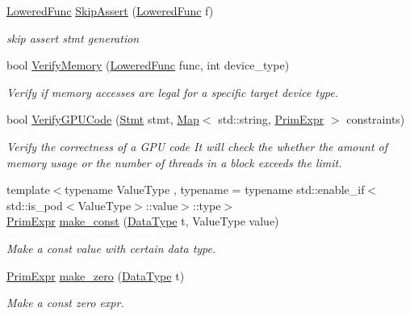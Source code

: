 \begin{DoxyCompactItemize}
\hyperlink{classtvm_1_1tir_1_1LoweredFunc}{Lowered\+Func} \hyperlink{namespacetvm_1_1tir_a9968b6563c42117a9a1cd4576054400f}{Skip\+Assert} (\hyperlink{classtvm_1_1tir_1_1LoweredFunc}{Lowered\+Func} f)
\begin{DoxyCompactList}\small\item\em skip assert stmt generation \end{DoxyCompactList}\item 
bool \hyperlink{namespacetvm_1_1tir_aa649448c69d8324ba1fd7ec5e3e54731}{Verify\+Memory} (\hyperlink{classtvm_1_1tir_1_1LoweredFunc}{Lowered\+Func} func, int device\+\_\+type)
\begin{DoxyCompactList}\small\item\em Verify if memory accesses are legal for a specific target device type. \end{DoxyCompactList}\item 
bool \hyperlink{namespacetvm_1_1tir_a705b3e58180a12eba5297cb2442fd1a2}{Verify\+G\+P\+U\+Code} (\hyperlink{classtvm_1_1tir_1_1Stmt}{Stmt} stmt, \hyperlink{classtvm_1_1Map}{Map}$<$ std\+::string, \hyperlink{classtvm_1_1PrimExpr}{Prim\+Expr} $>$ constraints)
\begin{DoxyCompactList}\small\item\em Verify the correctness of a G\+PU code It will check the whether the amount of memory usage or the number of threads in a block exceeds the limit. \end{DoxyCompactList}\item 
{\footnotesize template$<$typename Value\+Type , typename  = typename std\+::enable\+\_\+if$<$std\+::is\+\_\+pod$<$\+Value\+Type$>$\+::value$>$\+::type$>$ }\\\hyperlink{classtvm_1_1PrimExpr}{Prim\+Expr} \hyperlink{namespacetvm_1_1tir_a4ea566597880d04bd62fbec687e338b5}{make\+\_\+const} (\hyperlink{namespacetvm_a41918af1a1dc386388639a9d3ad06c5d}{Data\+Type} t, Value\+Type value)
\begin{DoxyCompactList}\small\item\em Make a const value with certain data type. \end{DoxyCompactList}\item 
\hyperlink{classtvm_1_1PrimExpr}{Prim\+Expr} \hyperlink{namespacetvm_1_1tir_adc4408508a413fb7f3b2567f8d847dbb}{make\+\_\+zero} (\hyperlink{namespacetvm_a41918af1a1dc386388639a9d3ad06c5d}{Data\+Type} t)
\begin{DoxyCompactList}\small\item\em Make a const zero expr. \end{DoxyCompactList}\item 

\end{DoxyCompactItemize}
